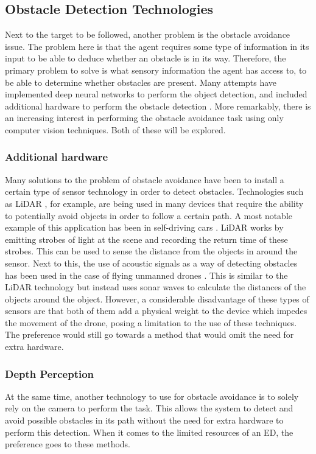 \subsection{Obstacle Detection Technologies}
Next to the target to be followed, another problem is the obstacle avoidance issue. 
The problem here is that the agent requires some type of information in its input 
to be able to deduce whether an obstacle is in its way. Therefore, the primary problem to solve is what sensory 
information the agent has access to, to be able to determine whether obstacles are present. 
Many attempts have implemented deep neural networks to perform 
the object detection, and included additional hardware to perform the obstacle detection \cite{Visual-GPS, lidarinselfdrivingcar,acousticdronefollower}.  
More remarkably, there is an increasing interest in performing the obstacle avoidance 
task using only computer vision techniques. Both of these will be explored. 

\subsubsection{Additional hardware}
Many solutions to the problem of obstacle avoidance have been to install a 
certain type of sensor technology in order to detect obstacles. Technologies such as 
LiDAR \cite{ObstacleAvoidance}, for example, are being used in many devices that require 
the ability to potentially avoid objects in order to follow a certain path. A most notable
example of this application has been in self-driving cars \cite{lidarinselfdrivingcar}. LiDAR 
works by emitting strobes of light at the scene and recording the return time of these 
strobes. This can be used to sense the distance from the objects in around the sensor. 
Next to this, the use of acoustic signals as a way of detecting obstacles has been used 
in the case of flying unmanned drones \cite{acousticdronefollower}. This is similar to the 
LiDAR technology but instead uses sonar waves to calculate the distances of the objects 
around the object. However, a considerable disadvantage of these types of sensors are that 
both of them add a physical weight to the device which impedes the movement of 
the drone, posing a limitation to the use of these techniques. The preference would still 
go towards a method that would omit the need for extra hardware. 

\subsubsection{Depth Perception}
At the same time, another technology to use for obstacle avoidance is to 
solely rely on the camera to perform the task. This allows the 
system to detect and avoid possible obstacles in its path without the need for 
extra hardware to perform this detection. When it comes to the limited resources of an ED, the preference 
goes to these methods.

